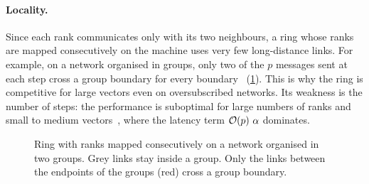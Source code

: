 \paragraph{Locality.}
Since each rank communicates only with its two neighbours, a ring whose ranks are mapped consecutively on the machine uses very few long-distance links.
For example, on a network organised in groups, only two of the $p$ messages sent at each step cross a group boundary for every boundary~\cite{desensi2025bine} (\cref{fig:bg-ring-locality}).
This is why the ring is competitive for large vectors even on oversubscribed networks.
Its weakness is the number of steps: the performance is suboptimal for large numbers of ranks and small to medium vectors~\cite{desensi2025bine}, where the latency term $\mathcal{O}\!\left(p\right)\,\alpha$ dominates.

\begin{figure}[H]
  \centering
  \caption{Ring with ranks mapped consecutively on a network organised in two groups.
           Grey links stay inside a group. Only the links between the endpoints of
           the groups (red) cross a group boundary.}
  \label{fig:bg-ring-locality}
\end{figure}

